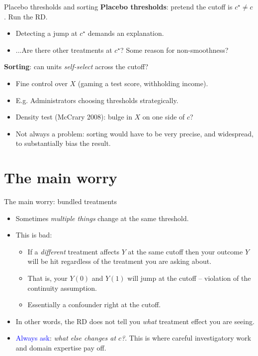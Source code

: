 \documentclass[handout,xcolor=dvipsnames]{beamer}
\begin{document}
\begin{frame}{Placebo thresholds and sorting}
\small
{} \textbf{Placebo thresholds}: pretend the cutoff is $c^\star \neq c$. Run the RD. \\
\smallskip
\begin{itemize}
  \footnotesize
  \item Detecting a jump at $c^\star$ demands an explanation.
  \item ...Are there other treatments at $c^\star$? Some reason for non-smoothness?
\end{itemize}
\bigskip
{} \textbf{Sorting}: can units \textit{self-select} across the cutoff?
\smallskip
\begin{itemize}
  \footnotesize
  \item Fine control over $X$ (gaming a test score, withholding income).
  \item E.g. Administrators choosing thresholds strategically.
  \item Density test (McCrary 2008): bulge in $X$ on one side of $c$?
  \item Not always a problem: sorting would have to be very precise, and widespread, to substantially bias the result.
\end{itemize}
\end{frame}


\section{The main worry}

\begin{frame}{The main worry: bundled treatments}
\small
\begin{itemize}
\item<1-> Sometimes \textit{multiple things} change at the same threshold.
\medskip
\item<2-> This is bad:
\begin{itemize}
  \footnotesize
  \item If a \textit{different} treatment affects $Y$ at the same cutoff then your outcome $Y$ will be hit regardless of the treatment you are asking about.
  \item That is, your $Y(0)$ and $Y(1)$ will jump at the cutoff -- violation of the continuity assumption.
  \item Essentially a confounder right at the cutoff.
\end{itemize}
\medskip
\item<3-> In other words, the RD does not tell you \textit{what} treatment effect you are seeing.
\medskip
\item<4-> \textcolor{Blue}{Always ask}: \textit{what else changes at $c$?}. This is where careful investigatory work and domain expertise pay off.
\end{itemize}
\end{frame}
\end{document}
